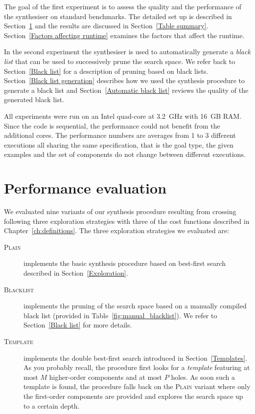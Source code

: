 The goal of the first experiment is to assess the quality and the performance of the synthesiser on standard benchmarks. The detailed set up is described in Section~\ref{Evaluation on benchmarks} and the results are discussed in Section~\ref{Table summary}. Section~\ref{Factors affecting runtime} examines the factors that affect the runtime.

In the second experiment the synthesiser is used to automatically generate a \emph{black list} that can be used to successively prune the search space. We refer back to Section~\ref{Black list} for a description of pruning based on black lists. Section~\ref{Black list generation} describes how we used the synthesis procedure to generate a black list and Section~\ref{Automatic black list} reviews the quality of the generated black list.

All experiments were run on an Intel quad-core at 3.2~GHz with 16~GB RAM. Since the code is sequential, the performance could not benefit from the additional cores. The performance numbers are averages from 1 to 3 different executions all sharing the same specification, that is the goal type, the given examples and the set of components do not change between different executions.

\section{Performance evaluation}\label{Evaluation on benchmarks}

We evaluated nine variants of our synthesis procedure resulting from crossing following three exploration strategies with three of the cost functions described in Chapter~\ref{ch:definitions}. The three exploration strategies we evaluated are:

\begin{description}
\item[\mdseries\textsc{Plain}] implements the basic synthesis procedure based on best-first search described in Section~\ref{Exploration}.
\item[\mdseries\textsc{Blacklist}] implements the pruning of the search space based on a manually compiled black list (provided in Table~\ref{fig:manual_blacklist}). We refer to Section~\ref{Black list} for more details.
\item[\mdseries\textsc{Template}] implements the double best-first search introduced in Section~\ref{Templates}. As you probably recall, the procedure first looks for a \emph{template} featuring at most $M$ higher-order components and at most $P$ holes. As soon such a template is found, the procedure falls back on the \textsc{Plain} variant where only the first-order components are provided and explores the search space up to a certain depth.
\end{description}

